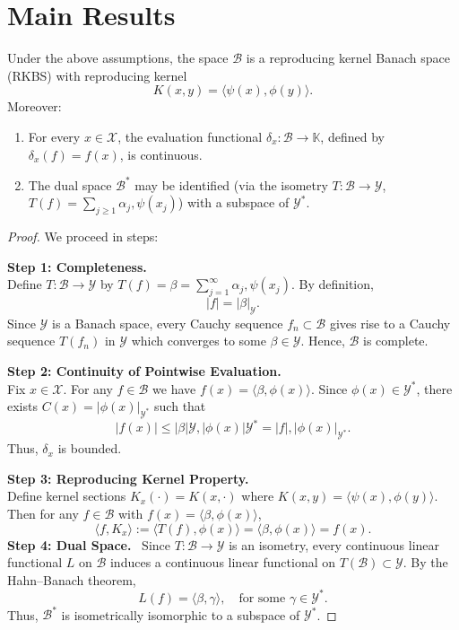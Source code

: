 \section{Main Results}
\begin{theorem}
Under the above assumptions, the space $\mathcal{B}$ is a reproducing kernel Banach space (RKBS) with reproducing kernel
\[
K(x,y)= \langle \psi(x), \phi(y)\rangle.
\]
Moreover:
\begin{enumerate}
\item For every $x\in\mathcal{X}$, the evaluation functional $\delta_x: \mathcal{B}\to \mathbb{K}$, defined by $\delta_x(f)= f(x)$, is continuous.
\item The dual space $\mathcal{B}^*$ may be identified (via the isometry $T: \mathcal{B}\to \mathcal{Y}$, $T(f)= \sum_{j\ge1}\alpha_j,\psi(x_j)$) with a subspace of $\mathcal{Y}^*$.
\end{enumerate}
\end{theorem}
\begin{proof}
We proceed in steps:
\medskip

\noindent\textbf{Step 1: Completeness.} \\
Define $T:\mathcal{B}\to \mathcal{Y}$ by $T(f)= \beta = \sum_{j=1}^\infty \alpha_j, \psi(x_j)$. By definition,
\[
|f| = |\beta|_{\mathcal{Y}}.
\]
Since $\mathcal{Y}$ is a Banach space, every Cauchy sequence ${f_n}\subset \mathcal{B}$ gives rise to a Cauchy sequence ${T(f_n)}$ in $\mathcal{Y}$ which converges to some $\beta\in \mathcal{Y}$. Hence, $\mathcal{B}$ is complete.
\medskip

\noindent\textbf{Step 2: Continuity of Pointwise Evaluation.} \\
Fix $x\in\mathcal{X}$. For any $f\in\mathcal{B}$ we have $f(x)= \langle \beta, \phi(x)\rangle$. Since $\phi(x)\in \mathcal{Y}^*$, there exists $C(x)=|\phi(x)|_{\mathcal{Y}^*}$ such that
\[
|f(x)| \le |\beta|{\mathcal{Y}}, |\phi(x)|{\mathcal{Y}^*} = |f|, |\phi(x)|_{\mathcal{Y}^*}.
\]
Thus, $\delta_x$ is bounded.
\medskip

\noindent\textbf{Step 3: Reproducing Kernel Property.} \\
Define kernel sections $K_x(\cdot)= K(x,\cdot)$ where $K(x,y)= \langle \psi(x), \phi(y)\rangle$. Then for any $f\in\mathcal{B}$ with $f(x)= \langle \beta, \phi(x)\rangle$,
\[
\langle f, K_x \rangle := \langle T(f), \phi(x) \rangle = \langle \beta, \phi(x)\rangle = f(x).
\]
\medskip
\noindent\textbf{Step 4: Dual Space.} \
Since $T:\mathcal{B}\to \mathcal{Y}$ is an isometry, every continuous linear functional $L$ on $\mathcal{B}$ induces a continuous linear functional on $T(\mathcal{B})\subset \mathcal{Y}$. By the Hahn--Banach theorem,
\[
L(f)= \langle \beta, \gamma \rangle, \quad \text{for some } \gamma\in \mathcal{Y}^*.
\]
Thus, $\mathcal{B}^*$ is isometrically isomorphic to a subspace of $\mathcal{Y}^*$.
\end{proof}
